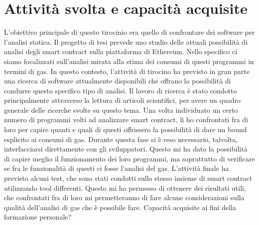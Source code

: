 \documentclass[a4paper,10pt]{article}
\begin{document}
\section{Attività svolta e capacità acquisite}
L'obiettivo principale di questo tirocinio era quello di confrontare dei software per l'analisi statica.\newline
Il progetto di tesi prevede uno studio delle attuali possibilità di analisi degli smart contract sulla piattaforma di Ethereum. Nello specifico ci siamo focalizzati sull'analisi mirata alla stima dei consumi di questi programmi in termini di gas.\newline
In questo contesto, l'attività di tirocino ha previsto in gran parte una ricerca di software attualmente disponibili che offrano la possibilità di condurre questo specifico tipo di analisi. Il lavoro di ricerca è stato condotto principalmente attraverso la lettura di articoli scientifici, per avere un quadro generale delle ricerche svolte su questo tema.\newline 
Una volta individuato un certo numero di programmi volti ad analizzare smart contract, li ho confrontati fra di loro per capire quanti e quali di questi offrissero la possibilità di dare un bound esplicito ai consumi di gas. Durante questa fase si è reso necessario, talvolta, interfacciarsi direttamente con gli sviluppatori. Questo mi ha dato la possibilità di capire meglio il funzionamento dei loro programmi, ma soprattutto di verificare se fra le funzionalità di questi ci fosse l'analisi del gas.\newline
L'attività finale ha previsto alcuni test, che sono stati condotti sullo stesso insieme di smart contract utilizzando tool differenti. Questo mi ha permesso di ottenere dei risultati utili, che confrontati fra di loro mi permetteranno di fare alcune considerazioni sulla qualità dell'analisi di gas che è possibile fare.\newline
\newline
Capacità acquisite ai fini della formazione personale?
\end{document}
